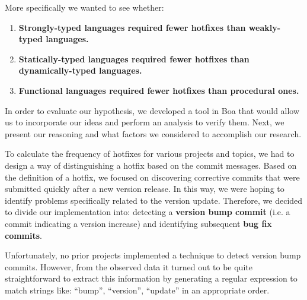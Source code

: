 More specifically we wanted to see whether:
\begin{enumerate}
\item \textbf{Strongly-typed languages required fewer hotfixes than weakly-typed languages.}
\item \textbf{Statically-typed languages required fewer hotfixes than dynamically-typed languages.}
\item \textbf{Functional languages required fewer hotfixes than procedural ones.}
\end{enumerate}
\par
In order to evaluate our hypothesis, we developed a tool in Boa \cite{Dyer-Nguyen-Rajan-Nguyen-13} that would allow us to incorporate our ideas and perform an analysis to verify them. Next, we present our reasoning and what factors we considered to accomplish our research.\par

To calculate the frequency of hotfixes for various projects and topics, we had to design a way of distinguishing a hotfix based on the commit messages. Based on the definition of a hotfix, we focused on discovering corrective commits that were submitted quickly after a new version release. In this way, we were hoping to identify problems specifically related to the version update. Therefore, we decided to divide our implementation into: detecting a \textbf{version bump commit} (i.e. a commit indicating a version increase) and identifying subsequent \textbf{bug fix commits}.\par

Unfortunately, no prior projects implemented a technique to detect version bump commits. However, from the observed data it turned out to be quite straightforward to extract this information by generating a regular expression to match strings like: ``bump'', ``version'', ``update'' in an appropriate order.\par

